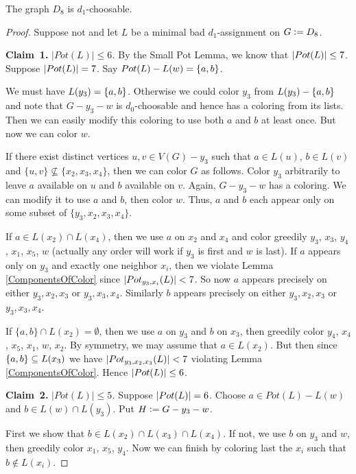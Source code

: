 

\begin{lem}\label{D8Choosable}
The graph $D_8$ is $d_1$-choosable.
\end{lem}
\begin{proof}
Suppose not and let $L$ be a minimal bad
$d_1$-assignment on $G \mathrel{\mathop:}= D_8$. 

\textbf{Claim~1.} \textit{$|Pot(L)|\le 6$.} By the Small Pot Lemma, we know that
$\left|Pot(L)\right|\le 7$.  Suppose $\left|Pot(L)\right| = 7$.  Say $Pot(L) - L(w) =
\left\{ a,b \right\}$.  

We must have $L(y_3) = \left\{ a,b \right\}$. Otherwise we could color $y_3$ from 
$L(y_3) - \left\{ a,b \right\}$ and note that $G-y_3-w$
is $d_0$-choosable and hence has a coloring from its lists.  Then we can easily
modify this coloring to use both $a$ and $b$ at least once.  But now we can
color $w$.

If there exist distinct vertices $u,v\in V(G)-y_3$ such that $a \in L(u)$, $b
\in L(v)$ and $\{u,v\}\not\subseteq \{x_2,x_3,x_4\}$, then we can color $G$ as
follows.  Color $y_3$ arbitrarily to leave $a$ available on $u$ and
$b$ available on $v$.  Again, $G-y_3-w$ has a coloring.  We can modify it to
use $a$ and $b$, then color $w$.  Thus, $a$ and $b$ each appear only on
some subset of $\{y_3,x_2,x_3,x_4\}$.  

If $a\in L(x_2)\cap L(x_4)$, then we use $a$ on $x_2$ and $x_4$ and color
greedily $y_3$, $x_3$, $y_4$, $x_1$, $x_5$, $w$ (actually any order will work
if $y_3$ is first and $w$ is last).   If $a$ appears only on $y_3$ and exactly
one neighbor $x_i$, then we violate Lemma \ref{ComponentsOfColor}
since $\left|Pot_{y_3, x_i}(L)\right| < 7$. So now $a$ appears precisely on either
$y_3,x_2,x_3$ or $y_3,x_3,x_4$. Similarly $b$ appears precisely on either
$y_3,x_2,x_3$ or $y_3,x_3,x_4$.

If $\{a,b\}\cap L(x_2)=\emptyset$, then we use $a$ on $y_3$ and $b$ on $x_3$,
then greedily color $y_4$, $x_4$, $x_5$, $x_1$, $w$, $x_2$.  By symmetry, we may
assume that $a \in L(x_2)$. But then since $\left\{ a,b \right\} \subseteq L(x_3)$ we
have $\left|Pot_{y_3, x_2, x_3}(L)\right| < 7$ violating Lemma
\ref{ComponentsOfColor}.  Hence $\left|Pot(L)\right| \leq 6$.

\textbf{Claim~2.} \textit{$|Pot(L)|\le 5$.}  Suppose $\left|Pot(L)\right|=6$.  Choose $a
\in Pot(L) - L(w)$ and $b \in L(w) \cap L(y_3)$.  Put $H \mathrel{\mathop:}= G - y_3 -
w$.

First we show that $b\in L(x_2)\cap L(x_3)\cap L(x_4)$.  If not, we use $b$ on
$y_3$ and $w$, then greedily color $x_1$, $x_5$, $y_4$.  Now we can finish by
coloring last the $x_i$ such that $b\notin L(x_i)$.


\end{proof}

